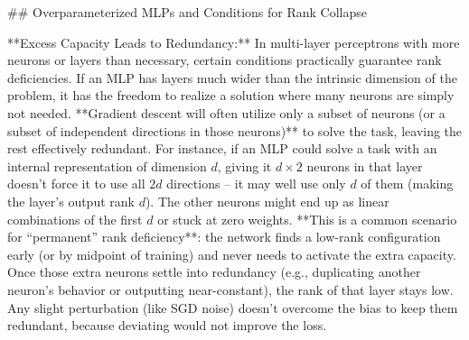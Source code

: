 ## Overparameterized MLPs and Conditions for Rank Collapse

**Excess Capacity Leads to Redundancy:** In multi-layer perceptrons with more neurons or layers than necessary, certain conditions practically guarantee rank deficiencies. If an MLP has layers much wider than the intrinsic dimension of the problem, it has the freedom to realize a solution where many neurons are simply not needed. **Gradient descent will often utilize only a subset of neurons (or a subset of independent directions in those neurons)** to solve the task, leaving the rest effectively redundant. For instance, if an MLP could solve a task with an internal representation of dimension $d$, giving it $d \times 2$ neurons in that layer doesn’t force it to use all $2d$ directions – it may well use only $d$ of them (making the layer’s output rank $d$). The other neurons might end up as linear combinations of the first $d$ or stuck at zero weights. **This is a common scenario for “permanent” rank deficiency**: the network finds a low-rank configuration early (or by midpoint of training) and never needs to activate the extra capacity. Once those extra neurons settle into redundancy (e.g., duplicating another neuron’s behavior or outputting near-constant), the rank of that layer stays low. Any slight perturbation (like SGD noise) doesn’t overcome the bias to keep them redundant, because deviating would not improve the loss.

